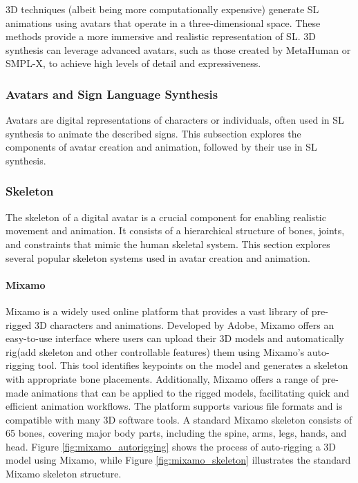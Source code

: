 \documentclass[../../main.tex]{subfiles}
\begin{document}
3D techniques (albeit being more computationally expensive) generate SL animations using avatars that operate in a three-dimensional space. These methods provide a more immersive and realistic representation of SL. 3D synthesis can leverage advanced avatars, such as those created by MetaHuman or SMPL-X, to achieve high levels of detail and expressiveness.

\subsubsection{Avatars and Sign Language Synthesis}
\label{subsubsec:avatars_sign_language_synthesis}

Avatars are digital representations of characters or individuals, often used in SL synthesis to animate the described signs. This subsection explores the components of avatar creation and animation, followed by their use in SL synthesis.

\subsubsection{Skeleton}
\label{subsubsec:skeleton}

The skeleton of a digital avatar is a crucial component for enabling realistic movement and animation. It consists of a hierarchical structure of bones, joints, and constraints that mimic the human skeletal system. This section explores several popular skeleton systems used in avatar creation and animation.

\paragraph{Mixamo}
\label{par:mixamo}

Mixamo is a widely used online platform that provides a vast library of pre-rigged 3D characters and animations. Developed by Adobe, Mixamo offers an easy-to-use interface where users can upload their 3D models and automatically rig(add skeleton and other controllable features) them using Mixamo's auto-rigging tool. This tool identifies keypoints on the model and generates a skeleton with appropriate bone placements. Additionally, Mixamo offers a range of pre-made animations that can be applied to the rigged models, facilitating quick and efficient animation workflows. The platform supports various file formats and is compatible with many 3D software tools. A standard Mixamo skeleton consists of 65 bones, covering major body parts, including the spine, arms, legs, hands, and head. Figure \ref{fig:mixamo_autorigging} shows the process of auto-rigging a 3D model using Mixamo, while Figure \ref{fig:mixamo_skeleton} illustrates the standard Mixamo skeleton structure.
\end{document}
